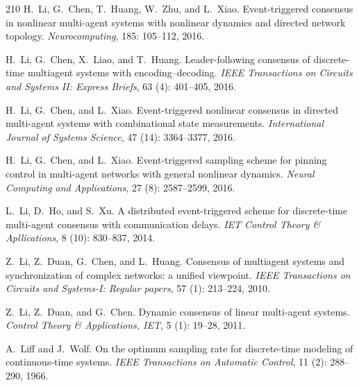 \documentclass{autart}
\begin{document}
{\begin{thebibliography}{210}
H.~Li, G.~Chen, T.~Huang, W.~Zhu, and L.~Xiao.
\newblock Event-triggered consensus in nonlinear multi-agent systems with
  nonlinear dynamics and directed network topology.
\newblock \emph{Neurocomputing}, 185: 105--112, 2016{}.

H.~Li, G.~Chen, X.~Liao, and T.~Huang.
\newblock Leader-following consensus of discrete-time multiagent systems with
  encoding--decoding.
\newblock \emph{IEEE Transactions on Circuits and Systems II: Express Briefs},
  63 (4): 401--405, 2016{}.

H.~Li, G.~Chen, and L.~Xiao.
\newblock Event-triggered nonlinear consensus in directed multi-agent systems
  with combinational state measurements.
\newblock \emph{International Journal of Systems Science}, 47
  (14): 3364--3377, 2016{}.

H.~Li, G.~Chen, and L.~Xiao.
\newblock Event-triggered sampling scheme for pinning control in multi-agent
  networks with general nonlinear dynamics.
\newblock \emph{Neural Computing and Applications}, 27 (8):
  2587--2599, 2016{}.

L.~Li, D.~Ho, and S.~Xu.
\newblock A distributed event-triggered scheme for discrete-time multi-agent
  consensus with communication delays.
\newblock \emph{IET Control Theory \& Apllications}, 8 (10):
  830--837, 2014.

Z.~Li, Z.~Duan, G.~Chen, and L.~Huang.
\newblock Consensus of multiagent systems and synchronization of complex
  networks: a unified viewpoint.
\newblock \emph{IEEE Transactions on Circuits and Systems-I: Regular papers},
  57 (1): 213--224, 2010.

Z.~Li, Z.~Duan, and G.~Chen.
\newblock Dynamic consensus of linear multi-agent systems.
\newblock \emph{Control Theory \& Applications, IET}, 5 (1):
  19--28, 2011.

A.~Liff and J.~Wolf.
\newblock On the optimum sampling rate for discrete-time modeling of
  continuous-time systems.
\newblock \emph{IEEE Transactions on Automatic Control}, 11
  (2): 288--290, 1966.


\end{thebibliography}}
\end{document}
